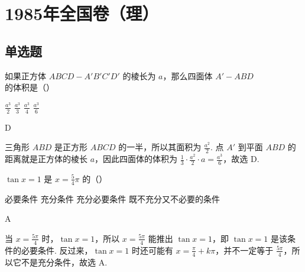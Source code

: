 \documentclass[UTF8,a4paper,oneside,11pt]{ctexbook}
\begin{document}
\mainmatter

\chapter{1985年全国卷（理）}

\section{单选题}

\begin{problem}

如果正方体 \(ABCD - A'B'C'D'\) 的棱长为 \(a\)，那么四面体 \(A' - ABD\) 的体积是（\quad）

\choices
    {\(\frac{a^{3}}{2}\)}
    {\(\frac{a^3}{3}\)}
    {\(\frac{a^3}{4}\)}
    {\(\frac{a^3}{6}\)}

\begin{answer}
D
\end{answer}

\begin{solution}
三角形 \(ABD\) 是正方形 \(ABCD\) 的一半，所以其面积为 \(\frac{a^2}{2}\). 点 \(A'\) 到平面 \(ABD\) 的距离就是正方体的棱长 \(a\)，因此四面体的体积为 \(\frac{1}{3}\cdot\frac{a^2}{2}\cdot a=\frac{a^3}{6}\)，故选 D.
\end{solution}
\end{problem}

\begin{problem}

\(\tan x = 1\) 是 \(x = \frac{5}{4}\pi\) 的（\quad）

\choices
    {必要条件}
    {充分条件}
    {充分必要条件}
    {既不充分又不必要的条件}

\begin{answer}
A
\end{answer}

\begin{solution}
当 \(x=\frac{5\pi}{4}\) 时，\(\tan x=1\)，所以 \(x=\frac{5\pi}{4}\) 能推出 \(\tan x=1\)，即 \(\tan x=1\) 是该条件的必要条件. 反过来，\(\tan x=1\) 时还可能有 \(x=\frac{\pi}{4}+k\pi\)，并不一定等于 \(\frac{5\pi}{4}\)，所以它不是充分条件，故选 A.
\end{solution}
\end{problem}
\end{document}
